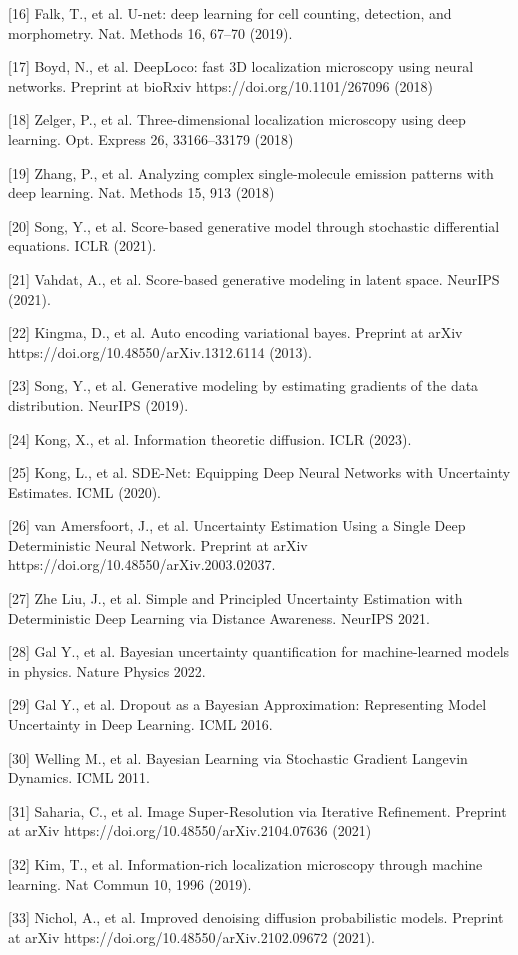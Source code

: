 \documentclass{article}
\begin{document}
{[16] Falk, T., et al. U-net: deep learning for cell counting, detection, and morphometry. Nat. Methods 16, 67–70 (2019).

[17] Boyd, N., et al. DeepLoco: fast 3D localization microscopy using neural networks. Preprint at bioRxiv https://doi.org/10.1101/267096 (2018)

[18] Zelger, P., et al. Three-dimensional localization microscopy using deep learning. Opt. Express 26, 33166–33179 (2018)

[19] Zhang, P., et al. Analyzing complex single-molecule emission patterns with deep learning. Nat. Methods 15, 913 (2018)

[20] Song, Y., et al. Score-based generative model through stochastic differential equations. ICLR (2021). 

[21] Vahdat, A., et al. Score-based generative modeling in latent space. NeurIPS (2021). 

[22] Kingma, D., et al. Auto encoding variational bayes. Preprint at arXiv 
https://doi.org/10.48550/arXiv.1312.6114 (2013). 

[23] Song, Y., et al. Generative modeling by estimating gradients of the data distribution. NeurIPS (2019). 

[24] Kong, X., et al. Information theoretic diffusion. ICLR (2023). 

[25] Kong, L., et al. SDE-Net: Equipping Deep Neural Networks with Uncertainty Estimates. ICML (2020). 

[26] van Amersfoort, J., et al. Uncertainty Estimation Using a Single Deep Deterministic Neural Network. Preprint at arXiv https://doi.org/10.48550/arXiv.2003.02037. 

[27] Zhe Liu, J., et al. Simple and Principled Uncertainty Estimation with
Deterministic Deep Learning via Distance Awareness. NeurIPS 2021. 

[28] Gal Y., et al. Bayesian uncertainty quantification
for machine-learned models in physics. Nature Physics 2022. 

[29] Gal Y., et al. Dropout as a Bayesian Approximation:
Representing Model Uncertainty in Deep Learning. ICML 2016. 

[30] Welling M., et al. Bayesian Learning via Stochastic Gradient Langevin Dynamics. ICML 2011. 

[31] Saharia, C., et al. Image Super-Resolution via Iterative Refinement. Preprint at arXiv https://doi.org/10.48550/arXiv.2104.07636 (2021)

[32] Kim, T., et al. Information-rich localization microscopy through machine learning. Nat Commun 10, 1996 (2019). 

[33] Nichol, A., et al. Improved denoising diffusion probabilistic models. Preprint at arXiv https://doi.org/10.48550/arXiv.2102.09672 (2021). 

}
\end{document}

